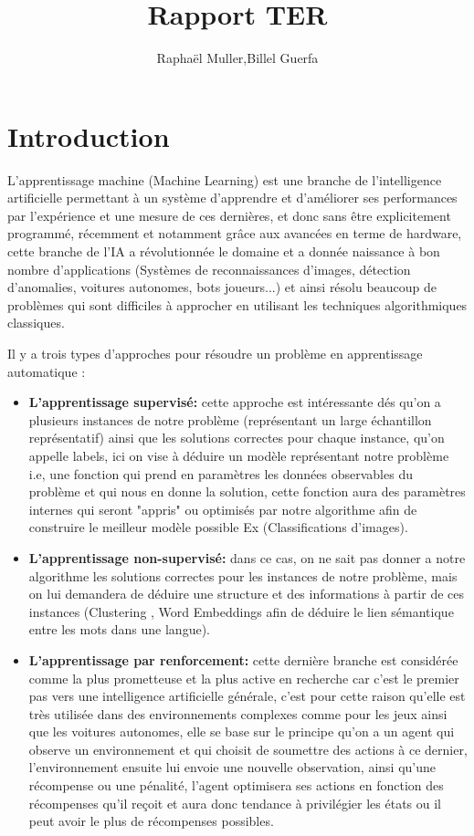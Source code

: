 \documentclass[a4paper,10pt]{article}
\begin{document}
\title{Rapport TER}
\author{Raphaël Muller,Billel Guerfa}
\maketitle

\part{Introduction}
\par
L'apprentissage machine (Machine Learning) est une branche de l'intelligence artificielle permettant à un système d'apprendre et d'améliorer ses performances par l'expérience et une mesure de ces dernières, et donc sans être explicitement programmé, récemment et notamment grâce aux avancées en terme de hardware, cette branche de l'IA a révolutionnée le domaine et a donnée naissance à bon nombre d'applications (Systèmes de reconnaissances d'images, détection d'anomalies, voitures autonomes, bots joueurs...) et ainsi résolu beaucoup de problèmes qui sont difficiles à approcher en utilisant les techniques algorithmiques classiques.
\par
Il y a trois types d'approches pour résoudre un problème en apprentissage automatique :
\begin{itemize}
\item  \textbf{L'apprentissage supervisé:} cette approche est intéressante dés qu'on a plusieurs instances de notre problème (représentant un large échantillon représentatif) ainsi que les solutions correctes pour chaque instance, qu'on appelle labels, ici on vise à déduire un modèle représentant notre problème i.e, une fonction qui prend en paramètres les données observables du problème et qui nous en donne la solution, cette fonction aura des paramètres internes qui seront "appris" ou optimisés par notre algorithme afin de construire le meilleur modèle possible Ex (Classifications d'images).
    
\item \textbf{L'apprentissage non-supervisé:} dans ce cas, on ne sait pas donner a notre algorithme les solutions correctes pour les instances de notre problème, mais on lui demandera de déduire une structure et des informations à partir de ces instances (Clustering , Word Embeddings afin de déduire le lien sémantique entre les mots dans une langue).

\item \textbf{L'apprentissage par renforcement:} cette dernière branche est considérée comme la plus prometteuse et la plus active en recherche car c'est le premier pas vers une intelligence artificielle générale, c'est pour cette raison qu'elle est très utilisée dans des environnements complexes comme pour les jeux ainsi que les voitures autonomes, elle se base sur le principe qu'on a un agent qui observe un environnement et qui choisit de soumettre des actions à ce dernier, l'environnement ensuite lui envoie une nouvelle observation, ainsi qu'une récompense ou une pénalité, l'agent optimisera ses actions en fonction des récompenses qu'il reçoit et aura donc tendance à privilégier les états ou il peut avoir le plus de récompenses possibles.
\end{itemize}
     
\end{document}
